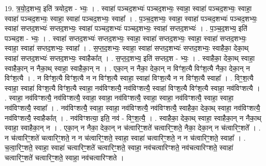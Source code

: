 \documentclass[17pt]{extarticle}
\begin{document}
19. त्र॒यो॒द॒शभ्य॒ इति॑ त्रयोद॒श - भ्यः॒ । . स्वाहा॑ पञ्चद॒शभ्यः॑ पञ्चद॒शभ्यः॒ स्वाहा॒ स्वाहा॑ पञ्चद॒शभ्यः॒ स्वाहा॒ स्वाहा॑ पञ्चद॒शभ्यः॒ स्वाहा॒ स्वाहा॑ पञ्चद॒शभ्यः॒ स्वाहा᳚ । . प॒ञ्च॒द॒शभ्यः॒ स्वाहा॒ स्वाहा॑ पञ्चद॒शभ्यः॑ पञ्चद॒शभ्यः॒ स्वाहा॑ सप्तद॒शभ्यः॑ सप्तद॒शभ्यः॒ स्वाहा॑ पञ्चद॒शभ्यः॑ पञ्चद॒शभ्यः॒ स्वाहा॑ सप्तद॒शभ्यः॑ । . प॒ञ्च॒द॒शभ्य॒ इति॑ पञ्चद॒श - भ्यः॒ । . स्वाहा॑ सप्तद॒शभ्यः॑ सप्तद॒शभ्यः॒ स्वाहा॒ स्वाहा॑ सप्तद॒शभ्यः॒ स्वाहा॒ स्वाहा॑ सप्तद॒शभ्यः॒ स्वाहा॒ स्वाहा॑ सप्तद॒शभ्यः॒ स्वाहा᳚ । . स॒प्त॒द॒शभ्यः॒ स्वाहा॒ स्वाहा॑ सप्तद॒शभ्यः॑ सप्तद॒शभ्यः॒ स्वाहैका॒ देका॒थ् स्वाहा॑ सप्तद॒शभ्यः॑ सप्तद॒शभ्यः॒ स्वाहैका᳚त् । . स॒प्त॒द॒शभ्य॒ इति॑ सप्तद॒श - भ्यः॒ । . स्वाहैका॒ देका॒थ् स्वाहा॒ स्वाहैका॒न् न नैका॒थ् स्वाहा॒ स्वाहैका॒न् न । . एका॒न् न नैका॒ देका॒न् न विꣳ॑श॒त्यै विꣳ॑श॒त्यै नैका॒ देका॒न् न विꣳ॑श॒त्यै । . न विꣳ॑श॒त्यै विꣳ॑श॒त्यै न न विꣳ॑श॒त्यै स्वाहा॒ स्वाहा॑ विꣳश॒त्यै न न विꣳ॑श॒त्यै स्वाहा᳚ । . विꣳ॒॒श॒त्यै स्वाहा॒ स्वाहा॑ विꣳश॒त्यै विꣳ॑श॒त्यै स्वाहा॒ नव॑विꣳशत्यै॒ नव॑विꣳशत्यै॒ स्वाहा॑ विꣳश॒त्यै विꣳ॑श॒त्यै स्वाहा॒ नव॑विꣳशत्यै । . स्वाहा॒ नव॑विꣳशत्यै॒ नव॑विꣳशत्यै॒ स्वाहा॒ स्वाहा॒ नव॑विꣳशत्यै॒ स्वाहा॒ स्वाहा॒ नव॑विꣳशत्यै॒ स्वाहा॒ स्वाहा॒ नव॑विꣳशत्यै॒ स्वाहा᳚ । . नव॑विꣳशत्यै॒ स्वाहा॒ स्वाहा॒ नव॑विꣳशत्यै॒ नव॑विꣳशत्यै॒ स्वाहैका॒ देका॒थ् स्वाहा॒ नव॑विꣳशत्यै॒ नव॑विꣳशत्यै॒ स्वाहैका᳚त् । . नव॑विꣳशत्या॒ इति॒ नव॑ - विꣳ॒॒श॒त्यै॒ । . स्वाहैका॒ देका॒थ् स्वाहा॒ स्वाहैका॒न् न नैका॒थ् स्वाहा॒ स्वाहैका॒न् न । . एका॒न् न नैका॒ देका॒न् न च॑त्वारिꣳ॒॒शते॑ चत्वारिꣳ॒॒शते॒ नैका॒ देका॒न् न च॑त्वारिꣳ॒॒शते᳚ । . न च॑त्वारिꣳ॒॒शते॑ चत्वारिꣳ॒॒शते॒ न न च॑त्वारिꣳ॒॒शते॒ स्वाहा॒ स्वाहा॑ चत्वारिꣳ॒॒शते॒ न न च॑त्वारिꣳ॒॒शते॒ स्वाहा᳚ । . च॒त्वा॒रिꣳ॒॒शते॒ स्वाहा॒ स्वाहा॑ चत्वारिꣳ॒॒शते॑ चत्वारिꣳ॒॒शते॒ स्वाहा॒ नव॑चत्वारिꣳशते॒ नव॑चत्वारिꣳशते॒ स्वाहा॑ चत्वारिꣳ॒॒शते॑ चत्वारिꣳ॒॒शते॒ स्वाहा॒ नव॑चत्वारिꣳशते । \newline
\end{document}

